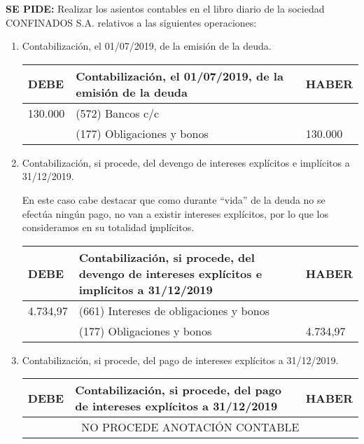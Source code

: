 \textbf{SE PIDE:} Realizar los asientos contables en el libro diario de la sociedad CONFINADOS S.A. relativos a las siguientes operaciones:
\begin{enumerate}[label=\alph*)]
\item Contabilización, el 01/07/2019, de la emisión de la deuda.

\begin{table}[H]
\centering
\begin{tabular}{|p{2cm}|p{8cm}|p{2cm}|}
\hline
\rowcolor{blue!30}
\textbf{DEBE} & \textbf{Contabilización, el 01/07/2019, de la emisión de la deuda} & \textbf{HABER} \\ \hline
130.000 & (572) Bancos c/c & \\ \hline
& (177) Obligaciones y bonos & 130.000 \\ \hline
\end{tabular}
\end{table}

\item Contabilización, si procede, del devengo de intereses explícitos e implícitos a 31/12/2019.

En este caso cabe destacar que como durante ``vida'' de la deuda no se efectúa ningún pago, no van a existir intereses explícitos, por lo que los consideramos en su totalidad \c{implícitos}.

\begin{table}[H]
\centering
\begin{tabular}{|p{2cm}|p{8cm}|p{2cm}|}
\hline
\rowcolor{blue!30}
\textbf{DEBE} & \textbf{Contabilización, si procede, del devengo de intereses explícitos e implícitos a 31/12/2019} & \textbf{HABER} \\ \hline
4.734,97 & (661) Intereses de obligaciones y bonos & \\ \hline
& (177) Obligaciones y bonos & 4.734,97 \\ \hline
\end{tabular}
\end{table}

\item Contabilización, si procede, del pago de intereses explícitos a 31/12/2019.

\begin{table}[H]
\centering
\begin{tabular}{|p{2cm}|p{8cm}|p{2cm}|}
\hline
\rowcolor{blue!30}
\textbf{DEBE} & \textbf{Contabilización, si procede, del pago de intereses explícitos a 31/12/2019} & \textbf{HABER} \\ \hline
\multicolumn{3}{|c|}{NO PROCEDE ANOTACIÓN CONTABLE} \\ \hline
\end{tabular}
\end{table}


\end{enumerate}
